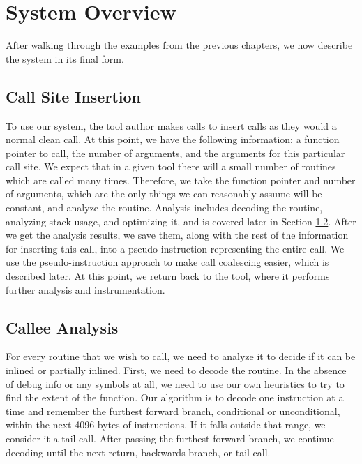 \chapter{System Overview}
\label{sec:system}

After walking through the examples from the previous chapters, we now describe
the system in its final form.

\section{Call Site Insertion}

To use our system, the tool author makes calls to insert calls as they would a
normal clean call.  At this point, we have the following information: a function
pointer to call, the number of arguments, and the arguments for this particular
call site.  We expect that in a given tool there will a small number of routines
which are called many times.  Therefore, we take the function pointer and number
of arguments, which are the only things we can reasonably assume will be
constant, and analyze the routine.  Analysis includes decoding the routine,
analyzing stack usage, and optimizing it, and is covered later in Section
\ref{sec:callee}.  After we get the analysis results, we save them, along with
the rest of the information for inserting this call, into a pseudo-instruction
representing the entire call.  We use the pseudo-instruction approach to make
call coalescing easier, which is described later.  At this point, we return back
to the tool, where it performs further analysis and instrumentation.

\section{Callee Analysis}
\label{sec:callee}

For every routine that we wish to call, we need to analyze it to decide if it
can be inlined or partially inlined.  First, we need to decode the routine.
In the absence of debug info or any symbols at all, we need to use our own
heuristics to try to find the extent of the function.  Our algorithm is to
decode one instruction at a time and remember the furthest forward branch,
conditional or unconditional, within the next 4096 bytes of instructions.  If it
falls outside that range, we consider it a tail call.  After passing the
furthest forward branch, we continue decoding until the next return, backwards
branch, or tail call.

